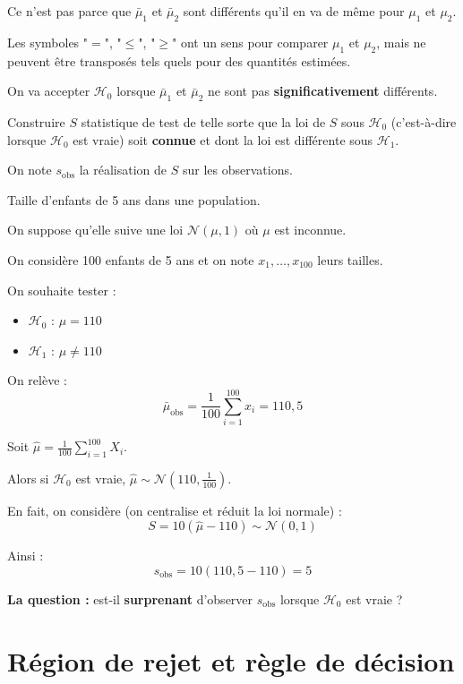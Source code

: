 Ce n'est pas parce que $\bar{\mu}_1$ et $\bar{\mu}_2$ sont différents qu'il en va de même pour $\mu_1$ et $\mu_2$.

Les symboles "$=$", "$\leq$", "$\geq$" ont un sens pour comparer $\mu_1$ et $\mu_2$, mais ne peuvent être transposés tels quels pour des quantités estimées.

On va accepter $\mathcal{H}_0$ lorsque $\bar{\mu}_1$ et $\bar{\mu}_2$ ne sont pas \textbf{significativement} différents.

\begin{objectif}
Construire $S$ statistique de test de telle sorte que la loi de $S$ sous $\mathcal{H}_0$ (c'est-à-dire lorsque $\mathcal{H}_0$ est vraie) soit \textbf{connue} et dont la loi est différente sous $\mathcal{H}_1$.

On note $s_{\text{obs}}$ la réalisation de $S$ sur les observations.
\end{objectif}

\begin{exemple}
Taille d'enfants de 5 ans dans une population.

On suppose qu'elle suive une loi $\mathcal{N}(\mu, 1)$ où $\mu$ est inconnue.

On considère 100 enfants de 5 ans et on note $x_1, \ldots, x_{100}$ leurs tailles.

On souhaite tester :
\begin{itemize}
\item $\mathcal{H}_0$ : $\mu = 110$
\item $\mathcal{H}_1$ : $\mu \neq 110$
\end{itemize}

On relève :
\[
\bar{\mu}_{\text{obs}} = \frac{1}{100} \sum_{i=1}^{100} x_i = 110{,}5
\]

Soit $\hat{\mu} = \frac{1}{100} \sum_{i=1}^{100} X_i$.

Alors si $\mathcal{H}_0$ est vraie, $\hat{\mu} \sim \mathcal{N}\left(110, \frac{1}{100}\right)$.

En fait, on considère (on centralise et réduit la loi normale) :
\[
S = 10(\hat{\mu} - 110) \sim \mathcal{N}(0, 1)
\]

Ainsi :
\[
s_{\text{obs}} = 10(110{,}5 - 110) = 5
\]

\textbf{La question :} est-il \textbf{surprenant} d'observer $s_{\text{obs}}$ lorsque $\mathcal{H}_0$ est vraie ?
\end{exemple}

\section{Région de rejet et règle de décision}

